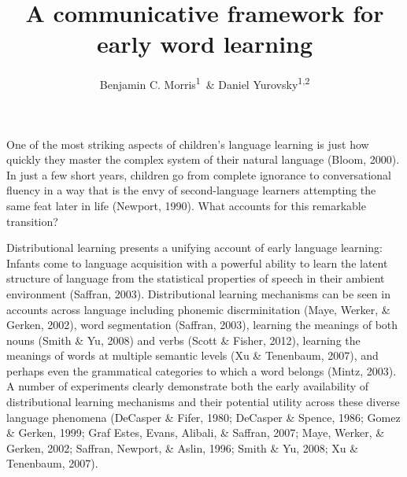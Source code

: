 \documentclass[english,,man,floatsintext]{apa6}
\author{Benjamin C. Morris\textsuperscript{1}\ \& Daniel Yurovsky\textsuperscript{1,2}}
\affiliation{
\vspace{0.5cm}
\textsuperscript{1} University of Chicago\\\textsuperscript{2} Carnegie Mellon University}
\title{A communicative framework for early word learning}
\date{}
\begin{document}
\maketitle

One of the most striking aspects of children's language learning is just how quickly they master the complex system of their natural language (Bloom, 2000). In just a few short years, children go from complete ignorance to conversational fluency in a way that is the envy of second-language learners attempting the same feat later in life (Newport, 1990). What accounts for this remarkable transition?

Distributional learning presents a unifying account of early language learning: Infants come to language acquisition with a powerful ability to learn the latent structure of language from the statistical properties of speech in their ambient environment (Saffran, 2003). Distributional learning mechanisms can be seen in accounts across language including phonemic discrminitation (Maye, Werker, \& Gerken, 2002), word segmentation (Saffran, 2003), learning the meanings of both nouns (Smith \& Yu, 2008) and verbs (Scott \& Fisher, 2012), learning the meanings of words at multiple semantic levels (Xu \& Tenenbaum, 2007), and perhaps even the grammatical categories to which a word belongs (Mintz, 2003). A number of experiments clearly demonstrate both the early availability of distributional learning mechanisms and their potential utility across these diverse language phenomena (DeCasper \& Fifer, 1980; DeCasper \& Spence, 1986; Gomez \& Gerken, 1999; Graf Estes, Evans, Alibali, \& Saffran, 2007; Maye, Werker, \& Gerken, 2002; Saffran, Newport, \& Aslin, 1996; Smith \& Yu, 2008; Xu \& Tenenbaum, 2007).
\end{document}
